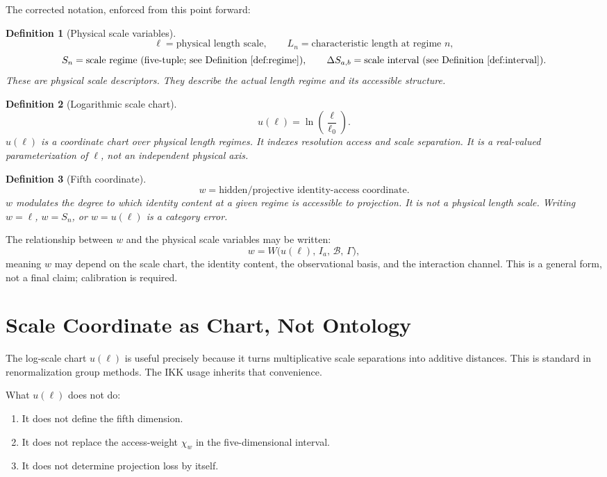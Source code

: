 \documentclass[11pt,a4paper,oneside]{article}
\newtheorem{definition}{Definition}[section]
\newcommand{\Ia}{I_a}                               %
\newcommand{\ellz}{\ell_0}                    %
\newcommand{\DSab}{\Delta S_{a,b}}             %
\newcommand{\wcoord}{w}
\newcommand{\uscale}{u(\ell)}                  %
\newcommand{\chiw}{\chi_w}                     %
\begin{document}
The corrected notation, enforced from this point forward:

\begin{definition}[Physical scale variables]
\[
\ell = \text{physical length scale},\qquad
L_n = \text{characteristic length at regime }n,
\]
\[
S_n = \text{scale regime (five-tuple; see Definition~\ref{def:regime})},\qquad
\DSab = \text{scale interval (see Definition~\ref{def:interval}).}
\]
These are physical scale descriptors. They describe the actual length regime and its accessible structure.
\end{definition}

\begin{definition}[Logarithmic scale chart]
\[
\uscale = \ln\!\left(\frac{\ell}{\ellz}\right).
\]
$u(\ell)$ is a coordinate chart over physical length regimes. It indexes resolution access and scale separation. It is a real-valued parameterization of $\ell$, not an independent physical axis.
\end{definition}

\begin{definition}[Fifth coordinate]
\[
\boxed{\wcoord = \text{hidden/projective identity-access coordinate.}}
\]
$\wcoord$ modulates the degree to which identity content at a given regime is accessible to projection. It is not a physical length scale. Writing $\wcoord = \ell$, $\wcoord = S_n$, or $\wcoord = \uscale$ is a category error.
\end{definition}

The relationship between $\wcoord$ and the physical scale variables may be written:
\[
\wcoord = W\!\big(\uscale,\, \Ia,\, \mathcal{B},\, \Gamma\big),
\]
meaning $\wcoord$ may depend on the scale chart, the identity content, the observational basis, and the interaction channel. This is a general form, not a final claim; calibration is required.

\section{Scale Coordinate as Chart, Not Ontology}

The log-scale chart $\uscale$ is useful precisely because it turns multiplicative scale separations into additive distances. This is standard in renormalization group methods. The IKK usage inherits that convenience.

What $\uscale$ does not do:
\begin{enumerate}
\item It does not define the fifth dimension.
\item It does not replace the access-weight $\chiw$ in the five-dimensional interval.
\item It does not determine projection loss by itself.
\end{enumerate}
\end{document}
